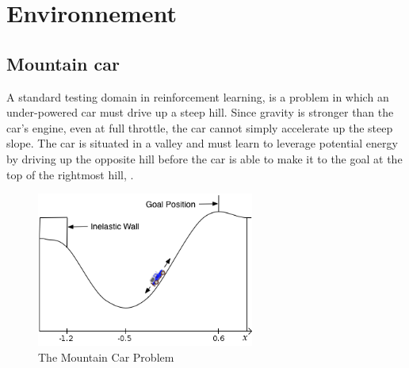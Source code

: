 \documentclass[a4paper,12pt]{article}
\begin{document}
  \begin{titlepage}
  \def\titletype{Experiments}
   \def\majortitle{Learning from expert}
   \def\docversion{1.1}
   
  \end{titlepage}

  
  \clearpage

  \tableofcontents
  

  \clearpage
  
  \renewcommand{\labelitemi}{$\bullet$}
  \renewcommand{\labelitemii}{$\circ$}
  \renewcommand{\labelitemiii}{$\diamond$}
  \renewcommand{\labelitemiv}{$\ast$}
  

  \clearpage
  \section{Environnement}
    \subsection{Mountain car}

    A standard testing domain in reinforcement learning, is a problem in which an under-powered 
    car must drive up a steep hill. Since gravity is stronger than the car's engine, even at full 
    throttle, the car cannot simply accelerate up the steep slope. The car is situated in a valley
    and must learn to leverage potential energy by driving up the opposite hill before the car is 
    able to make it to the goal at the top of the rightmost hill, \cite{ReinforceLearningIntro} .
    \begin{figure}[H]
      \begin{center}
	\includegraphics[width=270px]{Mcar}
	\caption{ The Mountain Car Problem }
	\end{center}
    \end{figure}
    
\end{document}
